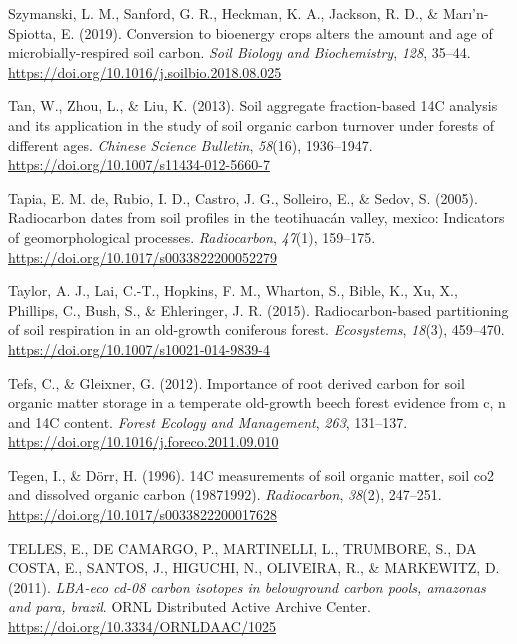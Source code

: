 \documentclass[]{article}
\begin{document}
\leavevmode\hypertarget{ref-Szymanski_2019}{}%
Szymanski, L. M., Sanford, G. R., Heckman, K. A., Jackson, R. D., \&
Marı'n-Spiotta, E. (2019). Conversion to bioenergy crops alters the
amount and age of microbially-respired soil carbon. \emph{Soil Biology
and Biochemistry}, \emph{128}, 35--44.
\url{https://doi.org/10.1016/j.soilbio.2018.08.025}

\leavevmode\hypertarget{ref-Tan_2013}{}%
Tan, W., Zhou, L., \& Liu, K. (2013). Soil aggregate fraction-based 14C
analysis and its application in the study of soil organic carbon
turnover under forests of different ages. \emph{Chinese Science
Bulletin}, \emph{58}(16), 1936--1947.
\url{https://doi.org/10.1007/s11434-012-5660-7}

\leavevmode\hypertarget{ref-de_Tapia_2005}{}%
Tapia, E. M. de, Rubio, I. D., Castro, J. G., Solleiro, E., \& Sedov, S.
(2005). Radiocarbon dates from soil profiles in the teotihuacán valley,
mexico: Indicators of geomorphological processes. \emph{Radiocarbon},
\emph{47}(1), 159--175. \url{https://doi.org/10.1017/s0033822200052279}

\leavevmode\hypertarget{ref-Taylor_2015}{}%
Taylor, A. J., Lai, C.-T., Hopkins, F. M., Wharton, S., Bible, K., Xu,
X., Phillips, C., Bush, S., \& Ehleringer, J. R. (2015).
Radiocarbon-based partitioning of soil respiration in an old-growth
coniferous forest. \emph{Ecosystems}, \emph{18}(3), 459--470.
\url{https://doi.org/10.1007/s10021-014-9839-4}

\leavevmode\hypertarget{ref-Tefs_2012}{}%
Tefs, C., \& Gleixner, G. (2012). Importance of root derived carbon for
soil organic matter storage in a temperate old-growth beech forest
evidence from c, n and 14C content. \emph{Forest Ecology and
Management}, \emph{263}, 131--137.
\url{https://doi.org/10.1016/j.foreco.2011.09.010}

\leavevmode\hypertarget{ref-Tegen_1996}{}%
Tegen, I., \& Dörr, H. (1996). 14C measurements of soil organic matter,
soil co2 and dissolved organic carbon (19871992). \emph{Radiocarbon},
\emph{38}(2), 247--251. \url{https://doi.org/10.1017/s0033822200017628}

\leavevmode\hypertarget{ref-https:ux2fux2fdoi.orgux2f10.3334ux2fornldaacux2f1025}{}%
TELLES, E., DE CAMARGO, P., MARTINELLI, L., TRUMBORE, S., DA COSTA, E.,
SANTOS, J., HIGUCHI, N., OLIVEIRA, R., \& MARKEWITZ, D. (2011).
\emph{LBA-eco cd-08 carbon isotopes in belowground carbon pools,
amazonas and para, brazil}. ORNL Distributed Active Archive Center.
\url{https://doi.org/10.3334/ORNLDAAC/1025}
\end{document}
